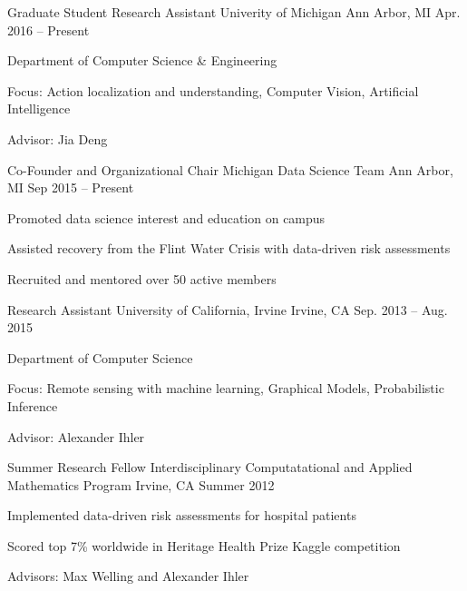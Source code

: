 \begin{cventries}
  \cventrynarrow
    {Graduate Student Research Assistant}
    {Univerity of Michigan}
    {Ann Arbor, MI}
    {Apr. 2016 -- Present}
    {
      \begin{cvitems}
        \item {Department of Computer Science \& Engineering}
        \item {Focus: Action localization and understanding, Computer
            Vision, Artificial Intelligence}
        \item {Advisor: Jia Deng}
      \end{cvitems}
    }
  \cventrynarrow
    {Co-Founder and Organizational Chair}
    {Michigan Data Science Team}
    {Ann Arbor, MI}
    {Sep 2015 -- Present}
    {
      \begin{cvitems}
        \item {Promoted data science interest and education on campus}
        \item {Assisted recovery from the Flint Water Crisis with
            data-driven risk assessments}
        \item {Recruited and mentored over 50 active members}
      \end{cvitems}
    }
  \cventry
    {Research Assistant}
    {University of California, Irvine}
    {Irvine, CA}
    {Sep. 2013 -- Aug. 2015}
    {
      \begin{cvitems}
        \item {Department of Computer Science}
        \item {Focus: Remote sensing with machine learning, Graphical
            Models, Probabilistic Inference}
        \item {Advisor: Alexander Ihler}
      \end{cvitems}
    }
  \cventryextranarrow
    {Summer Research Fellow}
    {Interdisciplinary Computatational and Applied Mathematics Program}
    {Irvine, CA}
    {Summer 2012}
    {
      \begin{cvitems}
        \item {Implemented data-driven risk assessments for hospital patients}
        \item {Scored top 7\% worldwide in Heritage Health Prize
            Kaggle competition}
        \item {Advisors: Max Welling and Alexander Ihler}
      \end{cvitems}
    }
\end{cventries}
